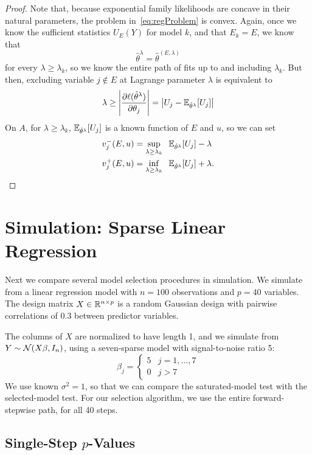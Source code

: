 \documentclass{article}
\begin{document}
\begin{proof}
  Note that, because exponential family likelihoods are concave in their natural parameters, the problem in~\eqref{eq:regProblem} is convex. Again, once we know the sufficient statistics $U_E(Y)$ for model $k$, and that $E_k=E$, we know that
  \[
  \hat\theta^\lambda = \hat\theta^{(E,\lambda)}
  \]
  for every $\lambda \geq \lambda_k$, so we know the entire path of fits up to and including $\lambda_k$. But then, excluding variable $j \notin E$ at Lagrange parameter $\lambda$ is equivalent to
  \[
  \lambda \geq 
  \left| \frac{\partial \ell(\hat\theta^\lambda)}{\partial \theta_j} \right|
  = \left|U_j - \mathbb{E}_{\hat\theta^\lambda}[U_j]\right|
  \]
  On $A$, for $\lambda \geq\lambda_k$, 
  $\mathbb{E}_{\hat\theta^\lambda}[U_j]$ is a known function of $E$ and $u$,
  so we can set
  \begin{align}\label{eq:vMinus_L1}
    v_j^-(E,u) &= \sup_{\lambda \geq \lambda_k} \;\; 
    \mathbb{E}_{\hat\theta^\lambda}[U_j] - \lambda \\
    \label{eq:vPlus_L1}
    v_j^+(E,u) &= \inf_{\lambda \geq \lambda_k} \;\;
    \mathbb{E}_{\hat\theta^\lambda}[U_j] + \lambda .
  \end{align}
\end{proof}


\section{Simulation: Sparse Linear Regression}
\label{sec:sparseReg}

Next we compare several model selection procedures in simulation. We simulate from a linear regression model with $n=100$ observations and $p=40$ variables. The design matrix $X\in\mathbb{R}^{n\times p}$ is a random Gaussian design with pairwise correlations of 0.3 between predictor variables.

The columns of $X$ are normalized to have length 1, and we simulate from $Y \sim \mathcal{N}(X\beta,I_n)$, using a seven-sparse model with signal-to-noise ratio 5:
\[
\beta_j = \left\{\begin{matrix}5 & j = 1,\ldots,7\\ 0 &
    j>7\end{matrix}\right.
\]
We use known $\sigma^2=1$, so that we can compare the saturated-model test with the selected-model test. For our selection algorithm, we use the entire forward-stepwise path, for all 40 steps. 

\subsection{Single-Step $p$-Values}
\end{document}
